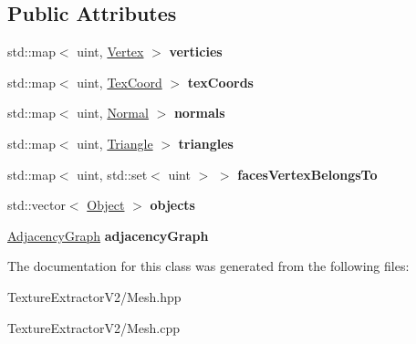 \subsection*{Public Attributes}
\begin{DoxyCompactItemize}
\item 
\hypertarget{class_mesh_a2cef656e11f17c6974a418c4fa0755fe}{}std\+::map$<$ uint, \hyperlink{struct_vertex}{Vertex} $>$ {\bfseries verticies}\label{class_mesh_a2cef656e11f17c6974a418c4fa0755fe}

\item 
\hypertarget{class_mesh_a615f86622e292b9bfa581cfad823b375}{}std\+::map$<$ uint, \hyperlink{struct_tex_coord}{Tex\+Coord} $>$ {\bfseries tex\+Coords}\label{class_mesh_a615f86622e292b9bfa581cfad823b375}

\item 
\hypertarget{class_mesh_afe59cf4410182ce7c42447b635c745e1}{}std\+::map$<$ uint, \hyperlink{struct_normal}{Normal} $>$ {\bfseries normals}\label{class_mesh_afe59cf4410182ce7c42447b635c745e1}

\item 
\hypertarget{class_mesh_a6afb31bd01dac6b21a548341d389b421}{}std\+::map$<$ uint, \hyperlink{struct_triangle}{Triangle} $>$ {\bfseries triangles}\label{class_mesh_a6afb31bd01dac6b21a548341d389b421}

\item 
\hypertarget{class_mesh_a5ad3c61ae2ecabc596a9d9cd01f29252}{}std\+::map$<$ uint, std\+::set$<$ uint $>$ $>$ {\bfseries faces\+Vertex\+Belongs\+To}\label{class_mesh_a5ad3c61ae2ecabc596a9d9cd01f29252}

\item 
\hypertarget{class_mesh_ad221985419bdc4e3f30396073e7aa107}{}std\+::vector$<$ \hyperlink{struct_object}{Object} $>$ {\bfseries objects}\label{class_mesh_ad221985419bdc4e3f30396073e7aa107}

\item 
\hypertarget{class_mesh_a7867e8a9f5b51b153a13d4e302578a1f}{}\hyperlink{class_adjacency_graph}{Adjacency\+Graph} {\bfseries adjacency\+Graph}\label{class_mesh_a7867e8a9f5b51b153a13d4e302578a1f}

\end{DoxyCompactItemize}


The documentation for this class was generated from the following files\+:\begin{DoxyCompactItemize}
\item 
Texture\+Extractor\+V2/Mesh.\+hpp\item 
Texture\+Extractor\+V2/Mesh.\+cpp\end{DoxyCompactItemize}
